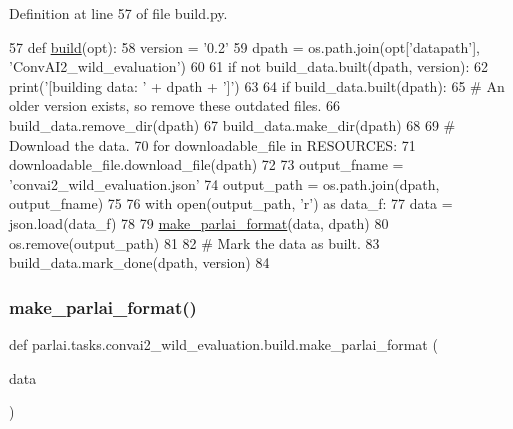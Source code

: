Definition at line 57 of file build.\+py.


\begin{DoxyCode}
57 \textcolor{keyword}{def }\hyperlink{namespacedialog__babi__feedback_1_1build_a7a9d289f7493a5ded13c4b7f071b6184}{build}(opt):
58     version = \textcolor{stringliteral}{'0.2'}
59     dpath = os.path.join(opt[\textcolor{stringliteral}{'datapath'}], \textcolor{stringliteral}{'ConvAI2\_wild\_evaluation'})
60 
61     \textcolor{keywordflow}{if} \textcolor{keywordflow}{not} build\_data.built(dpath, version):
62         print(\textcolor{stringliteral}{'[building data: '} + dpath + \textcolor{stringliteral}{']'})
63 
64         \textcolor{keywordflow}{if} build\_data.built(dpath):
65             \textcolor{comment}{# An older version exists, so remove these outdated files.}
66             build\_data.remove\_dir(dpath)
67         build\_data.make\_dir(dpath)
68 
69         \textcolor{comment}{# Download the data.}
70         \textcolor{keywordflow}{for} downloadable\_file \textcolor{keywordflow}{in} RESOURCES:
71             downloadable\_file.download\_file(dpath)
72 
73         output\_fname = \textcolor{stringliteral}{'convai2\_wild\_evaluation.json'}
74         output\_path = os.path.join(dpath, output\_fname)
75 
76         with open(output\_path, \textcolor{stringliteral}{'r') as data\_f:}
77 \textcolor{stringliteral}{            data = json.load(data\_f)}
78 \textcolor{stringliteral}{}
79 \textcolor{stringliteral}{        \hyperlink{namespaceparlai_1_1tasks_1_1quac_1_1build_a08c212462b5c58cde91192d35f24f0cc}{make\_parlai\_format}(data, dpath)}
80 \textcolor{stringliteral}{        os.remove(output\_path)}
81 \textcolor{stringliteral}{}
82 \textcolor{stringliteral}{        }\textcolor{comment}{# Mark the data as built.}
83         build\_data.mark\_done(dpath, version)
84 \end{DoxyCode}
\mbox{\label{namespaceparlai_1_1tasks_1_1convai2__wild__evaluation_1_1build_a6c2b84806e2cb18c6eedb72d161dec5e}} 
\subsubsection{\texorpdfstring{make\+\_\+parlai\+\_\+format()}{make\_parlai\_format()}}
{\footnotesize\ttfamily def parlai.\+tasks.\+convai2\+\_\+wild\+\_\+evaluation.\+build.\+make\+\_\+parlai\+\_\+format (\begin{DoxyParamCaption}\item[{}]{data }\end{DoxyParamCaption})}



